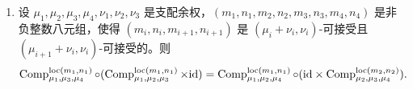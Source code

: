 \begin{proposition}
\begin{enumerate}
此外，若 $(m'_1,n'_1,m'_2,n'_2,m'_3,n'_3)\geq (m_1,n_1,m_2,n_2,m_3,n_3)$ 是满足同样条件的另一个六元组（允许 $(m'_1,n'_1,m'_2,n'_2,m'_3,n'_3)=(\infty,\infty,\infty,\infty,\infty,\infty)$），则下图交换。
{\footnotesize
\begin{equation*}
\label{E:projection localization truncated}
\xymatrix@C=5pt{
&&\Sht_{\mu_1|\mu_3}^{\nu_1+\nu_2,\loc(m'_1,n'_1)}
\ar[ddd]\ar[dll]\ar[dr]
\\
\Sht^{\loc(m'_1,n'_1)}_{\mu_1} \ar[d]^{\res^{m'_1,n'_1}_{m_1,n_1}} &\ar[l]\ar[d] \Sht_{\mu_1\mid\mu_2}^{\nu_1,\loc(m'_1,n'_1)} \times_{\Sht_{\mu_2}^\loc(m'_2,n'_2)} \Sht_{\mu_2\mid\mu_3}^{\nu_2,\loc(m'_2,n'_2)} \ar[l] \ar[rr] \ar[ur]_-{\mathrm{Comp}^{\loc(m'_1,n'_1)}}&& \Sht^{\loc(m_3,n_3)}_{\mu_3} \ar[d]_{\res^{m'_3,n'_3}_{m_3,n_3}}
\\
\Sht_{\mu_1}^{\loc(m_1,n_1)}
&\ar[l]\Sht_{\mu_1|\mu_2}^{\nu_1,\loc(m_1,n_1)} \times_{\Sht_{\mu_2}^{\loc(m_2,n_2)}} \Sht_{\mu_2|\mu_3}^{\nu_2,\loc(m_2,n_2)} \ar[rd]^-{\mathrm{Comp}^{\loc(m_1,n_1)}} \ar[rr]
&&\Sht_{\mu_3}^{\loc(m_3,n_3)}
\\
&& \Sht_{\mu_1|\mu_3}^{\nu_1+\nu_2, \loc(m_1,n_1)}\ar[ull]\ar[ru].
}
\end{equation*}}
此外，中间的梯形是笛卡儿的。

\item 设 $\mu_1, \mu_2, \mu_3, \mu_4, \nu_1, \nu_2, \nu_3$ 是支配余权，$(m_1, n_1, m_2,n_2, m_3,n_3, m_4,n_4)$ 是非负整数八元组，使得 $(m_i,n_i,m_{i+1},n_{i+1})$ 是 $(\mu_i+\nu_i,\nu_i)$-可接受且 $(\mu_{i+1}+\nu_i,\nu_i)$-可接受的。则
\[\operatorname{Comp}_{\mu_1,\mu_3, \mu_4}^{\mathrm{loc}(m_1,n_1)}\circ (\operatorname{Comp}_{\mu_1,\mu_2, \mu_3}^{\mathrm{loc}(m_1,n_1)} \times {\operatorname{id}})=\operatorname{Comp}_{\mu_1,\mu_2, \mu_4}^{\mathrm{loc}(m_1,n_1)}\circ ({\operatorname{id}} \times \operatorname{Comp}_{\mu_2,\mu_3, \mu_4}^{\mathrm{loc}(m_2,n_2)}).\]
\end{enumerate}
\end{proposition}

